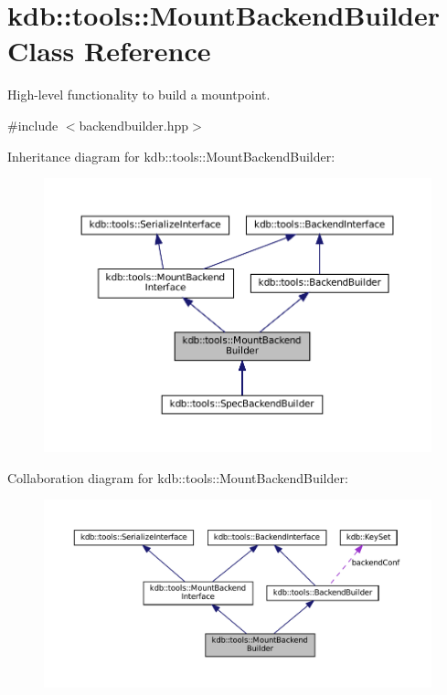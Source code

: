 \hypertarget{classkdb_1_1tools_1_1MountBackendBuilder}{}\section{kdb\+::tools\+::Mount\+Backend\+Builder Class Reference}
\label{classkdb_1_1tools_1_1MountBackendBuilder}


High-\/level functionality to build a mountpoint.  




{\ttfamily \#include $<$backendbuilder.\+hpp$>$}



Inheritance diagram for kdb\+::tools\+::Mount\+Backend\+Builder\+:
\nopagebreak
\begin{figure}[H]
\begin{center}
\leavevmode
\includegraphics[width=350pt]{classkdb_1_1tools_1_1MountBackendBuilder__inherit__graph}
\end{center}
\end{figure}


Collaboration diagram for kdb\+::tools\+::Mount\+Backend\+Builder\+:
\nopagebreak
\begin{figure}[H]
\begin{center}
\leavevmode
\includegraphics[width=350pt]{classkdb_1_1tools_1_1MountBackendBuilder__coll__graph}
\end{center}
\end{figure}
